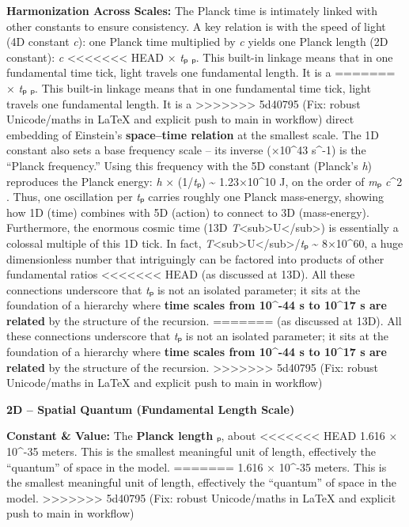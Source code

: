 \documentclass[]{article}
\begin{document}
\textbf{Harmonization Across Scales:} The Planck time is intimately
linked with other constants to ensure consistency. A key relation is
with the speed of light (4D constant \emph{c}): one Planck time
multiplied by \emph{c} yields one Planck length (2D constant): \emph{c}
<<<<<<< HEAD
× \emph{t}ₚ \approx \emph{\ell}ₚ\hspace{0pt}. This built-in linkage means that in
one fundamental time tick, light travels one fundamental length. It is a
=======
× \emph{t}ₚ \approx \emph{\ell}ₚ​. This built-in linkage means that in one
fundamental time tick, light travels one fundamental length. It is a
>>>>>>> 5d40795 (Fix: robust Unicode/maths in LaTeX and explicit push to main in workflow)
direct embedding of Einstein's \textbf{space--time relation} at the
smallest scale. The 1D constant also sets a base frequency scale -- its
inverse (×10\^{}43 s\^{}-1) is the ``Planck frequency.'' Using
this frequency with the 5D constant (Planck's \emph{h}) reproduces the
Planck energy: \emph{h} × (1/\emph{t}ₚ) \textasciitilde{} 1.23×10\^{}10
J, on the order of \emph{m}ₚ \emph{c}\^{}2​. Thus, one oscillation per
\emph{t}ₚ carries roughly one Planck mass-energy, showing how 1D (time)
combines with 5D (action) to connect to 3D (mass-energy). Furthermore,
the enormous cosmic time (13D
\emph{T}\textless{}sub\textgreater{}U\textless{}/sub\textgreater{}) is
essentially a colossal multiple of this 1D tick. In fact,
\emph{T}\textless{}sub\textgreater{}U\textless{}/sub\textgreater{}/\emph{t}ₚ
\textasciitilde{} 8×10\^{}60, a huge dimensionless number that
intriguingly can be factored into products of other fundamental ratios
<<<<<<< HEAD
(as discussed at 13D)\hspace{0pt}. All these connections underscore that
\emph{t}ₚ is not an isolated parameter; it sits at the foundation of a
hierarchy where \textbf{time scales from 10\^{}-44 s to 10\^{}17 s are
related} by the structure of the recursion.
=======
(as discussed at 13D)​. All these connections underscore that \emph{t}ₚ
is not an isolated parameter; it sits at the foundation of a hierarchy
where \textbf{time scales from 10\^{}-44 s to 10\^{}17 s are related} by
the structure of the recursion.
>>>>>>> 5d40795 (Fix: robust Unicode/maths in LaTeX and explicit push to main in workflow)

\textbf{2D -- Spatial Quantum (Fundamental Length Scale)}

\textbf{Constant \& Value:} The \textbf{Planck length} \emph{\ell}ₚ, about
<<<<<<< HEAD
1.616 × 10\^{}-35 meters\hspace{0pt}. This is the smallest meaningful
unit of length, effectively the ``quantum'' of space in the model.
=======
1.616 × 10\^{}-35 meters​. This is the smallest meaningful unit of
length, effectively the ``quantum'' of space in the model.
>>>>>>> 5d40795 (Fix: robust Unicode/maths in LaTeX and explicit push to main in workflow)
\end{document}

